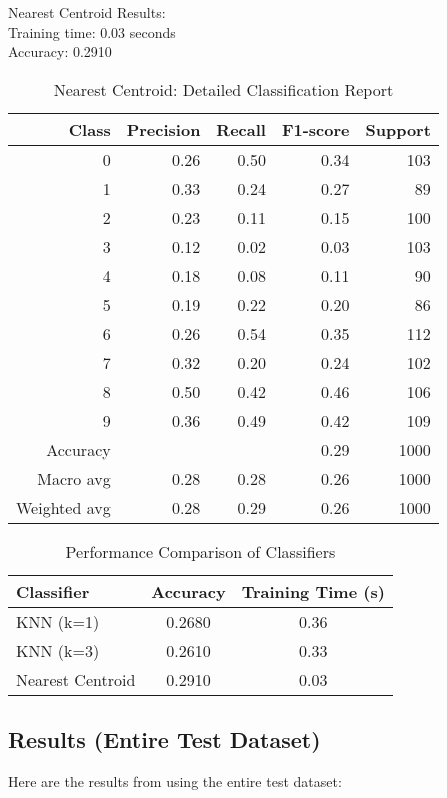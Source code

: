Nearest Centroid Results:\\
Training time: 0.03 seconds\\
Accuracy: 0.2910
\begin{table}[H]
\centering
  \begin{tabular}{r r r r r}
    \toprule
    Class & Precision & Recall & F1-score & Support \\
    \midrule
    0 & 0.26 & 0.50 & 0.34 & 103 \\
    1 & 0.33 & 0.24 & 0.27 & 89 \\
    2 & 0.23 & 0.11 & 0.15 & 100 \\
    3 & 0.12 & 0.02 & 0.03 & 103 \\
    4 & 0.18 & 0.08 & 0.11 & 90 \\
    5 & 0.19 & 0.22 & 0.20 & 86 \\
    6 & 0.26 & 0.54 & 0.35 & 112 \\
    7 & 0.32 & 0.20 & 0.24 & 102 \\
    8 & 0.50 & 0.42 & 0.46 & 106 \\
    9 & 0.36 & 0.49 & 0.42 & 109 \\
    \midrule
    Accuracy & & & 0.29 & 1000 \\
    Macro avg & 0.28 & 0.28 & 0.26 & 1000 \\
    Weighted avg & 0.28 & 0.29 & 0.26 & 1000 \\
    \bottomrule
  \end{tabular}
  \vspace{10pt}
  \caption{Nearest Centroid: Detailed Classification Report} 
\end{table}

\begin{table}[H]
  \centering
  \begin{tabular}{lcc}
    \toprule
    Classifier & Accuracy & Training Time (s) \\
    \midrule
    KNN (k=1) & 0.2680 & 0.36 \\
    KNN (k=3) & 0.2610 & 0.33 \\
    Nearest Centroid & 0.2910 & 0.03 \\
    \bottomrule
  \end{tabular}
  \vspace{10pt}
  \caption{Performance Comparison of Classifiers}
\end{table}

\subsection{Results (Entire Test Dataset)}
Here are the results from using the entire test dataset:\\

